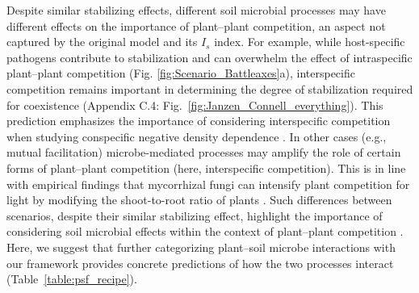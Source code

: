 Despite similar stabilizing effects, different soil microbial processes may have different effects on the importance of plant--plant competition, an aspect not captured by the original \citet{Bever1997} model and its $I_{s}$ index.
For example, while host-specific pathogens contribute to stabilization and can overwhelm the effect of intraspecific plant--plant competition (Fig. \ref{fig:Scenario_Battleaxes}a), interspecific competition remains important in determining the degree of stabilization required for coexistence (Appendix C.4: Fig.~\ref{fig:Janzen_Connell_everything}). This prediction emphasizes the importance of considering interspecific competition when studying conspecific negative density dependence \citep{LaManna2017}.
In other cases (e.g., mutual facilitation) microbe-mediated processes may amplify the role of certain forms of plant--plant competition (here, interspecific competition). This is in line with empirical findings that mycorrhizal fungi can intensify plant competition for light \citep{Facelli1999} by modifying the shoot-to-root ratio of plants \citep{Veresoglou2012}.
Such differences between scenarios, despite their similar stabilizing effect, highlight the importance of considering soil microbial effects within the context of plant--plant competition \citep{Callaway2004, Casper2007, Shannon2012, Crawford2017, Peay2018}.
Here, we suggest that further categorizing plant--soil microbe interactions with our framework provides concrete predictions of how the two processes interact (Table~\ref{table:psf_recipe}).
\par



